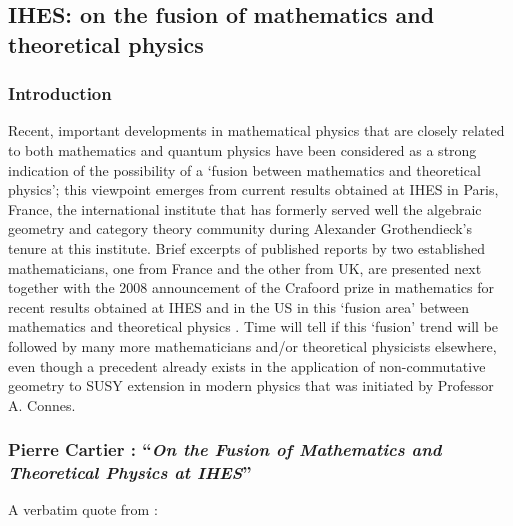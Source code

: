 \documentclass[12pt]{article}
\theoremstyle{plain}
\theoremstyle{definition}
\numberwithin{equation}{section}
\begin{document}
\subsection{IHES: on the fusion of mathematics and theoretical physics}

\subsubsection{Introduction}
  Recent, important developments in mathematical physics that are closely related to both mathematics and quantum physics have been considered as a strong indication of the possibility of a `fusion between mathematics
and theoretical physics'; this viewpoint emerges from current results obtained at IHES in Paris, France,
the international institute that has formerly served well the algebraic geometry and category theory community
during Alexander Grothendieck's tenure at this institute. Brief excerpts of published reports by two established
mathematicians, one from France and the other from UK, are presented next together with the 2008 announcement
of the Crafoord prize in mathematics for recent results obtained at IHES and in the US in this `fusion area' between mathematics and theoretical physics 
. Time will tell if this `fusion' trend will be followed by many more mathematicians and/or theoretical physicists elsewhere, even though a precedent already exists in the application of non-commutative geometry to SUSY extension in modern physics that was initiated by Professor A. Connes. 

\subsubsection{Pierre Cartier : ``{\em On the Fusion of Mathematics and Theoretical Physics at IHES}''}

A verbatim quote from : 
\end{document}
